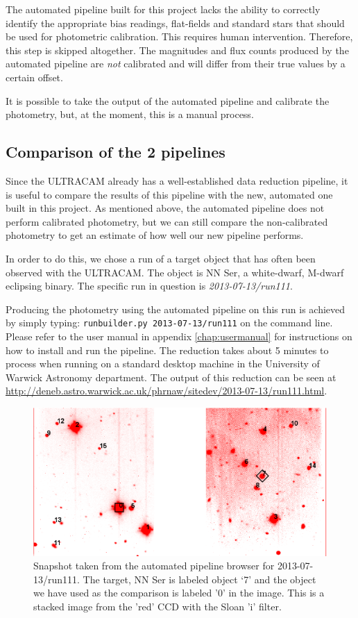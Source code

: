 The automated pipeline built for this project lacks the ability to correctly identify the appropriate bias readings, flat-fields and standard stars that should be used for photometric calibration. This requires human intervention. Therefore, this step is skipped altogether. The magnitudes and flux counts produced by the automated pipeline are \emph{not} calibrated and will differ from their true values by a certain offset.

It is possible to take the output of the automated pipeline and calibrate the photometry, but, at the moment, this is a manual process. 

\subsection{Comparison of the 2 pipelines}
Since the ULTRACAM already has a well-established data reduction pipeline, it is useful to compare the results of this pipeline with the new, automated one built in this project. As mentioned above, the automated pipeline does not perform calibrated photometry, but we can still compare the non-calibrated photometry to get an estimate of how well our new pipeline performs.

In order to do this, we chose a run of a target object that has often been observed with the ULTRACAM. The object is NN Ser, a white-dwarf, M-dwarf eclipsing binary. The specific run in question is \emph{2013-07-13/run111}.

Producing the photometry using the automated pipeline on this run is achieved by simply typing: \texttt{runbuilder.py 2013-07-13/run111} on the command line. Please refer to the user manual in appendix \ref{chap:usermanual} for instructions on how to install and run the pipeline.  The reduction takes about 5 minutes to process when running on a standard desktop machine in the University of Warwick Astronomy department. The output of this reduction can be seen at \url{http://deneb.astro.warwick.ac.uk/phrnaw/sitedev/2013-07-13/run111.html}.

\begin{figure}
\centering
\includegraphics[width=120mm]{images/2013-07-13-run111-r-withlabels.png}
\caption{Snapshot taken from the automated pipeline browser for 2013-07-13/run111. The target, {NN Ser} is labeled object `7' and the object we have used as the comparison is labeled '0' in the image. This is a stacked image from the 'red' CCD with the Sloan 'i' filter. }
\label{fig:nnserfield}
\end{figure}

